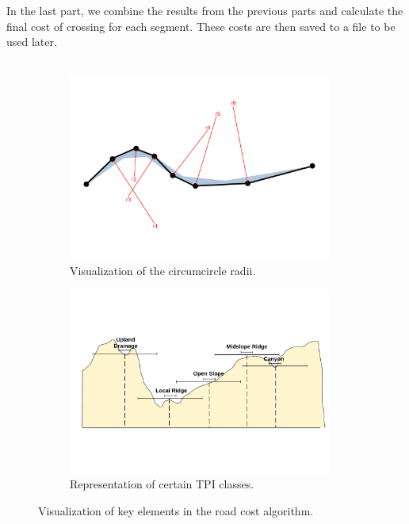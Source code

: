             In the last part, we combine the results from the previous parts and calculate the final cost of crossing for each segment. These costs are then saved to a file to be used later.\\\\
            \begin{figure}[ht]
                \centering
                \begin{subfigure}[b]{0.9\textwidth}
                    \centering
                    \includegraphics[trim={0cm 3.55cm 0cm 2.8cm}, clip, width=0.95\textwidth]{images/path_curvature.pdf}
                    \caption{Visualization of the circumcircle radii.}
                    \label{fig:curvature}
                \end{subfigure}
                \begin{subfigure}[b]{0.9\textwidth}
                    \centering
                    \includegraphics[trim={0cm 5.2cm 0cm 5.2cm}, clip, width=0.95\textwidth]{images/TPI_classification.pdf}
                    \caption{Representation of certain TPI classes.}
                    \label{fig:TPI}
                \end{subfigure}
                \caption{Visualization of key elements in the road cost algorithm.}
            \end{figure}
